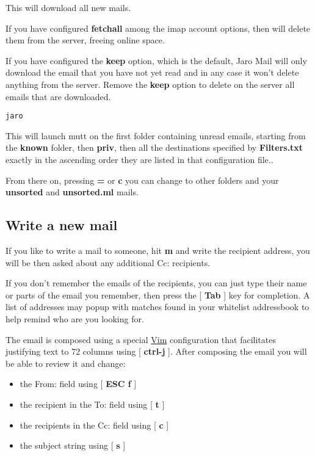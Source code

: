 \documentclass[a4,onecolumn,portrait]{article}
\begin{document}
This will download all new mails.

If you have configured \textbf{fetchall} among the imap account options, then
will delete them from the server, freeing online space.

If you have configured the \textbf{keep} option, which is the default, Jaro Mail will only download the email that you have not yet read and in any case it won't delete anything from the server. Remove the \textbf{keep} option to delete on the server all emails that are downloaded.

\begin{verbatim}
jaro
\end{verbatim}

This will launch mutt on the first folder containing unread emails, starting from the \textbf{known} folder, then \textbf{priv}, then all the destinations specified by \textbf{Filters.txt} exactly in the ascending order they are listed in that configuration file..

From there on, pressing \textbf{=} or \textbf{c} you can change to other folders and your \textbf{unsorted} and \textbf{unsorted.ml} mails.
\subsection{Write a new mail}
\label{sec-6-2}

If you like to write a mail to someone, hit \textbf{m} and write the recipient address, you will be then asked about any additional Cc: recipients.

If you don't remember the emails of the recipients, you can just type their name or parts of the email you remember, then press the [ \textbf{Tab} ]
key for completion. A list of addresses may popup with matches found in your whitelist addressbook to help remind who are you looking for.

The email is composed using a special \href{http://www.vim.org/}{Vim} configuration that facilitates justifying text to 72 columns using [ \textbf{ctrl-j} ]. After composing the email you will be able to review it and change:

\begin{itemize}
\item the From: field using [ \textbf{ESC f} ]
\item the recipient in the To: field using [ \textbf{t} ]
\item the recipients in the Cc: field using [ \textbf{c} ]
\item the subject string using [ \textbf{s} ]
\end{itemize}
\end{document}

